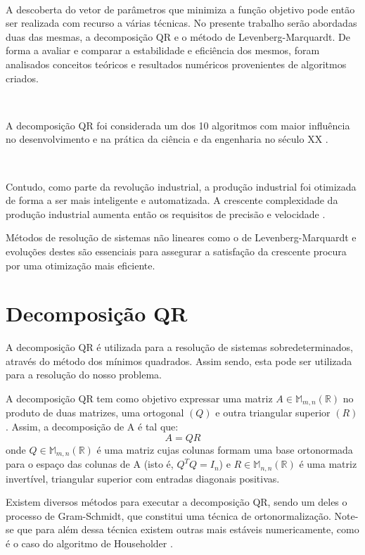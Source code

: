 \documentclass[]{article}
\numberwithin{equation}{subsection}
\begin{document}
\(\ \)

A descoberta do vetor de parâmetros que minimiza a função objetivo pode
então ser realizada com recurso a várias técnicas. No presente trabalho
serão abordadas duas das mesmas, a decomposição QR e o método de
Levenberg-Marquardt. De forma a avaliar e comparar a estabilidade e
eficiência dos mesmos, foram analisados conceitos teóricos e resultados
numéricos provenientes de algoritmos criados.

\(\ \)

A decomposição QR foi considerada um dos 10 algoritmos com maior
influência no desenvolvimento e na prática da ciência e da engenharia no
século XX \cite{BAC00}.

\(\ \)

Contudo, como parte da revolução industrial, a produção industrial foi
otimizada de forma a ser mais inteligente e automatizada. A crescente
complexidade da produção industrial aumenta então os requisitos de
precisão e velocidade \cite{XHHCBJ23}.

Métodos de resolução de sistemas não lineares como o de
Levenberg-Marquardt e evoluções destes são essenciais para assegurar a
satisfação da crescente procura por uma otimização mais eficiente.

\newpage
\section{Decomposição QR}

A decomposição QR é utilizada para a resolução de sistemas
sobredeterminados, através do método dos mínimos quadrados. Assim sendo,
esta pode ser utilizada para a resolução do nosso problema.

A decomposição QR tem como objetivo expressar uma matriz
\(A\in \mathbb{M}_{m,n} (\mathbb{R})\) no produto de duas matrizes, uma
ortogonal \((Q)\) e outra triangular superior \((R)\). Assim, a
decomposição de A é tal que: \begin{equation}
A=QR
\end{equation} onde \(Q\in \mathbb{M}_{m,n} (\mathbb{R})\) é uma matriz
cujas colunas formam uma base ortonormada para o espaço das colunas de A
(isto é, \(Q^T Q = I_n\)) e \(R\in \mathbb{M}_{n,n} (\mathbb{R})\) é uma
matriz invertível, triangular superior com entradas diagonais positivas.

Existem diversos métodos para executar a decomposição QR, sendo um deles
o processo de Gram-Schmidt, que constitui uma técnica de
ortonormalização. Note-se que para além dessa técnica existem outras
mais estáveis numericamente, como é o caso do algoritmo de Householder
\cite{GASMK08}.
\end{document}
